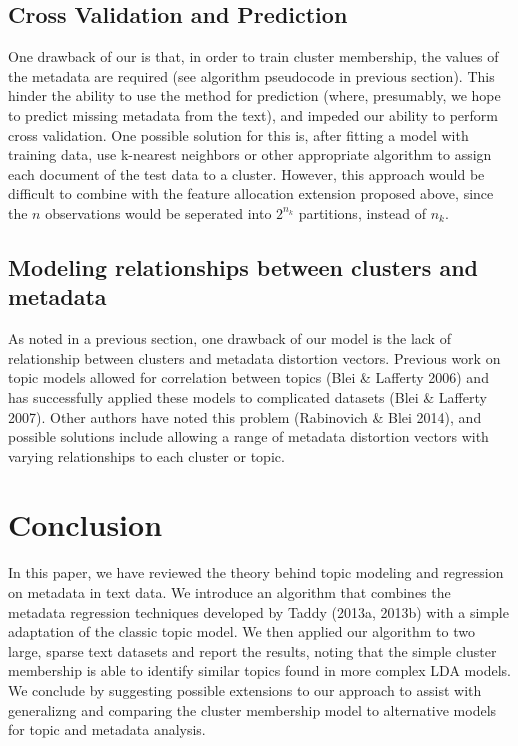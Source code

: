 \documentclass[12pt]{article}
\begin{document}
\subsection{Cross Validation and Prediction}
One drawback of our is that, in order to train cluster membership, the values of the metadata are required (see algorithm pseudocode in previous section). This hinder the ability to use the method for prediction (where, presumably, we hope to predict missing metadata from the text), and impeded our ability to perform cross validation. One possible solution for this is, after fitting a model with training data, use k-nearest neighbors or other appropriate algorithm to assign each document of the test data to a cluster. However, this approach would be difficult to combine with the feature allocation extension proposed above, since the $n$ observations would be seperated into $2^{n_k}$ partitions, instead of $n_k$. 

\subsection{Modeling relationships between clusters and metadata}
As noted in a previous section, one drawback of our model is the lack of relationship between clusters and metadata distortion vectors. 
Previous work on topic models allowed for correlation between topics (Blei \& Lafferty 2006) and has successfully applied these models to complicated datasets (Blei \& Lafferty 2007).
Other authors have noted this problem (Rabinovich \& Blei 2014), and possible solutions include allowing a range of metadata distortion vectors with varying relationships to each cluster or topic. 


\section{Conclusion}\label{conclusion}

In this paper, we have reviewed the theory behind topic modeling and regression on metadata in text data. 
We introduce an algorithm that combines the metadata regression techniques developed by Taddy (2013a, 2013b) with a simple adaptation of the classic topic model.
We then applied our algorithm to two large, sparse text datasets and report the results, noting that the simple cluster membership is able to identify similar topics found in more complex LDA models. 
We conclude by suggesting possible extensions to our approach to assist with generalizng and comparing the cluster membership model to alternative models for topic and metadata analysis. 
\end{document}
